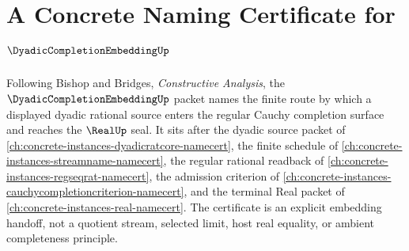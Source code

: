 \chapter{A Concrete Naming Certificate for $\DyadicCompletionEmbeddingUp$}
\label{ch:concrete-instances-dyadic-completion-embedding-namecert}

Following Bishop and Bridges, \emph{Constructive Analysis}, the $\DyadicCompletionEmbeddingUp$ packet names the finite route by which a displayed dyadic rational source enters the regular Cauchy completion surface and reaches the $\RealUp$ seal. It sits after the dyadic source packet of \autoref{ch:concrete-instances-dyadicratcore-namecert}, the finite schedule of \autoref{ch:concrete-instances-streamname-namecert}, the regular rational readback of \autoref{ch:concrete-instances-regseqrat-namecert}, the admission criterion of \autoref{ch:concrete-instances-cauchycompletioncriterion-namecert}, and the terminal Real packet of \autoref{ch:concrete-instances-real-namecert}. The certificate is an explicit embedding handoff, not a quotient stream, selected limit, host real equality, or ambient completeness principle.


